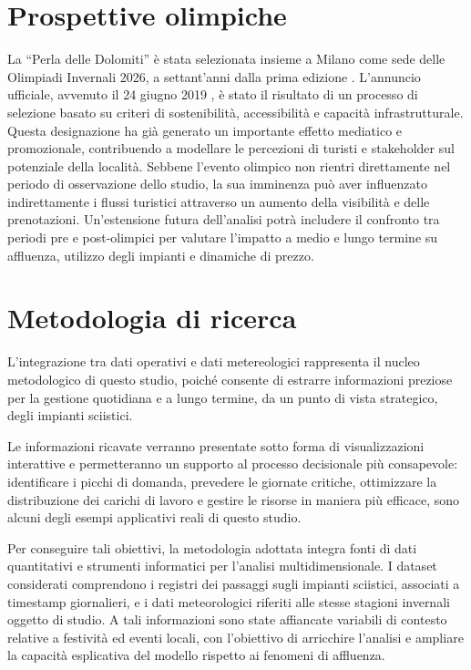 \section{Prospettive olimpiche}
La “Perla delle Dolomiti” è stata selezionata insieme a Milano come sede delle Olimpiadi Invernali 2026, a settant’anni dalla prima edizione \cite{Milano_Cortina_olympics}. L’annuncio ufficiale, avvenuto il 24 giugno 2019 \cite{Olympic_nominee}, è stato il risultato di un processo di selezione basato su criteri di sostenibilità, accessibilità e capacità infrastrutturale.\\
Questa designazione ha già generato un importante effetto mediatico e promozionale, contribuendo a modellare le percezioni di turisti e stakeholder sul potenziale della località. Sebbene l’evento olimpico non rientri direttamente nel periodo di osservazione dello studio, la sua imminenza può aver influenzato indirettamente i flussi turistici attraverso un aumento della visibilità e delle prenotazioni.
Un’estensione futura dell’analisi potrà includere il confronto tra periodi pre e post-olimpici per valutare l’impatto a medio e lungo termine su affluenza, utilizzo degli impianti e dinamiche di prezzo.


\section{Metodologia di ricerca}
L'integrazione tra dati operativi e dati metereologici rappresenta il nucleo metodologico di questo studio, poiché consente di estrarre informazioni preziose per la gestione quotidiana e a lungo termine, da un punto di vista strategico,  degli impianti sciistici.

Le informazioni ricavate verranno presentate  sotto forma di visualizzazioni interattive e permetteranno un supporto al processo decisionale più consapevole: identificare i picchi di domanda, prevedere le giornate critiche, ottimizzare la distribuzione dei carichi di lavoro e gestire le risorse in maniera più efficace, sono alcuni degli esempi applicativi reali di questo studio.

Per conseguire tali obiettivi, la metodologia adottata integra fonti di dati quantitativi e strumenti informatici per l’analisi multidimensionale. I dataset considerati comprendono i registri dei passaggi sugli impianti sciistici, associati a timestamp giornalieri, e i dati meteorologici riferiti alle stesse stagioni invernali oggetto di studio. A tali informazioni sono state affiancate variabili di contesto relative a festività ed eventi locali, con l’obiettivo di arricchire l’analisi e ampliare la capacità esplicativa del modello rispetto ai fenomeni di affluenza. 

